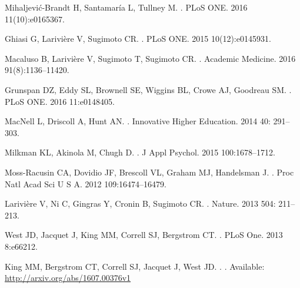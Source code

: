 \documentclass[10pt,letterpaper]{article}
\begin{document}
\begin{flushleft}
\begin{thebibliography}{10}

  Mihaljevi{\'c}-Brandt H, Santamar{\'i}a L, Tullney M.
.
\newblock PLoS ONE. 2016 11(10):e0165367.

Ghiasi G, Larivi{\`e}re V, Sugimoto CR.
.
\newblock PLoS ONE. 2015 10(12):e0145931.

Macaluso B, Larivi{\`e}re V, Sugimoto T, Sugimoto CR.
.
\newblock Academic Medicine. 2016  91(8):1136–11420.

Grunspan DZ, Eddy SL, Brownell SE, Wiggins BL, Crowe AJ, Goodreau SM.
.
\newblock PLoS ONE. 2016 11:e0148405.

MacNell L, Driscoll A, Hunt AN.
.
\newblock   Innovative Higher Education. 2014 40: 291–303.

Milkman KL, Akinola M, Chugh D.
.
\newblock J Appl Psychol. 2015 100:1678–1712.

Moss-Racusin CA, Dovidio JF, Brescoll VL, Graham MJ, Handelsman J.
.
\newblock  Proc Natl Acad Sci U S A. 2012 109:16474–16479.

Larivi{\`e}re V, Ni C, Gingras Y, Cronin B, Sugimoto CR.
.
\newblock  Nature. 2013 504: 211–213.

West JD, Jacquet J, King MM, Correll SJ, Bergstrom CT.
.
\newblock PLoS One. 2013 8:e66212.

King MM, Bergstrom CT, Correll SJ, Jacquet J, West JD.
.
. Available: \url{http://arxiv.org/abs/1607.00376v1}


\end{thebibliography}
\end{flushleft}
\end{document}
